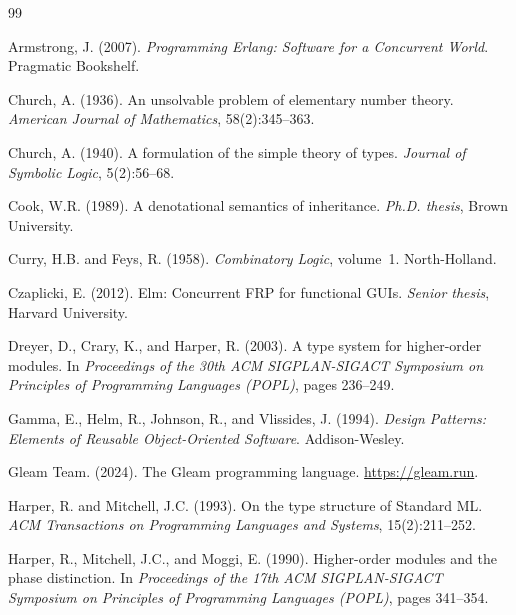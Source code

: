 \documentclass[11pt,a4paper]{article}
\begin{document}
\begin{thebibliography}{99}

Armstrong, J. (2007).
\newblock \emph{Programming Erlang: Software for a Concurrent World}.
\newblock Pragmatic Bookshelf.

Church, A. (1936).
\newblock An unsolvable problem of elementary number theory.
\newblock \emph{American Journal of Mathematics}, 58(2):345--363.

Church, A. (1940).
\newblock A formulation of the simple theory of types.
\newblock \emph{Journal of Symbolic Logic}, 5(2):56--68.

Cook, W.R. (1989).
\newblock A denotational semantics of inheritance.
\newblock \emph{Ph.D. thesis}, Brown University.

Curry, H.B. and Feys, R. (1958).
\newblock \emph{Combinatory Logic}, volume~1.
\newblock North-Holland.

Czaplicki, E. (2012).
\newblock Elm: Concurrent FRP for functional GUIs.
\newblock \emph{Senior thesis}, Harvard University.

Dreyer, D., Crary, K., and Harper, R. (2003).
\newblock A type system for higher-order modules.
\newblock In \emph{Proceedings of the 30th ACM SIGPLAN-SIGACT Symposium on Principles of Programming Languages (POPL)}, pages 236--249.

Gamma, E., Helm, R., Johnson, R., and Vlissides, J. (1994).
\newblock \emph{Design Patterns: Elements of Reusable Object-Oriented Software}.
\newblock Addison-Wesley.

Gleam Team. (2024).
\newblock The Gleam programming language.
\newblock \url{https://gleam.run}.

Harper, R. and Mitchell, J.C. (1993).
\newblock On the type structure of Standard ML.
\newblock \emph{ACM Transactions on Programming Languages and Systems}, 15(2):211--252.

Harper, R., Mitchell, J.C., and Moggi, E. (1990).
\newblock Higher-order modules and the phase distinction.
\newblock In \emph{Proceedings of the 17th ACM SIGPLAN-SIGACT Symposium on Principles of Programming Languages (POPL)}, pages 341--354.


\end{thebibliography}
\end{document}
